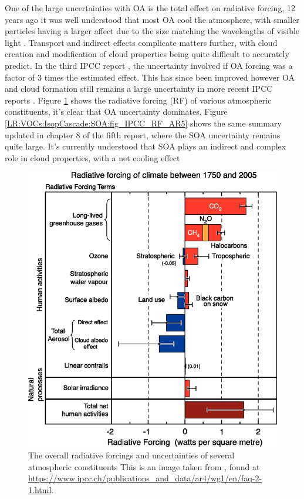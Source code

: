     One of the large uncertainties with OA is the total effect on radiative forcing, 12 years ago it was well understood that most OA cool the atmosphere, with smaller particles having a larger affect due to the size matching the wavelengths of visible light \parencite{Kanakidou2005}. 
    Transport and indirect effects complicate matters further, with cloud creation and modification of cloud properties being quite difficult to accurately predict.
    In the third IPCC report \parencite{IPCC2001}, the uncertainty involved if OA forcing was a factor of 3 times the estimated effect. 
    This has since been improved however OA and cloud formation still remains a large uncertainty in more recent IPCC reports \parencite{IPCC_Chapter2}.
    Figure \ref{LR:VOCs:IsopCascade:SOA:fig_IPCC_RF_AR4} shows the radiative forcing (RF) of various atmospheric constituents, it's clear that OA uncertainty dominates.
    Figure \ref{LR:VOCs:IsopCascade:SOA:fig_IPCC_RF_AR5} shows the same summary updated in chapter 8 of the fifth report, where the SOA uncertainty remains quite large.
    It's currently understood that SOA plays an indirect and complex role in cloud properties, with a net cooling effect \parencite[Chapter 7,8]{IPCC_AR5_WG1}
    
    \begin{figure}
      \includegraphics[width=\textwidth]{Figures/IPCC_WG1AR4_RFSummary.png}
      \caption{%
        The overall radiative forcings and uncertainties of several atmospheric constituents
        This is an image taken from \cite{IPCC_Chapter2}, found at \url{https://www.ipcc.ch/publications_and_data/ar4/wg1/en/faq-2-1.html}.}
      \label{LR:VOCs:IsopCascade:SOA:fig_IPCC_RF_AR4}
    \end{figure}
    
